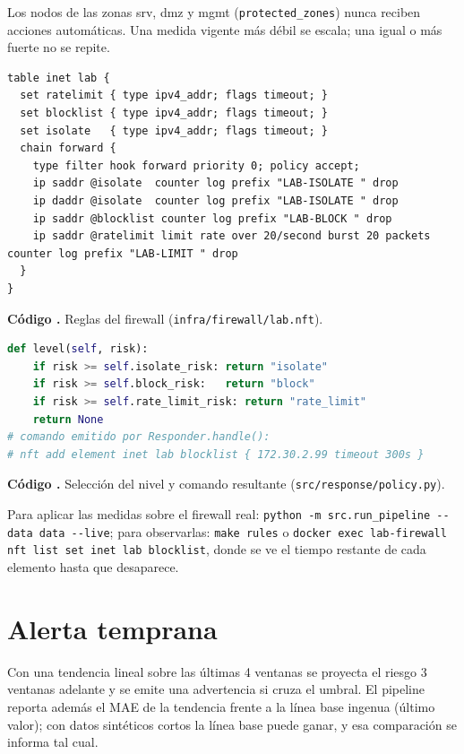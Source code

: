 \documentclass[conference,onecolumn]{IEEEtran}
\newcommand{\cmd}[1]{\texttt{#1}}
\newcounter{codigo}
\newcommand{\codigo}[2]{\par\refstepcounter{codigo}\label{#2}{\footnotesize\textbf{Código \thecodigo.} #1}\par\nopagebreak}
\begin{document}
Los nodos de las zonas srv, dmz y mgmt (\cmd{protected\_zones}) nunca reciben acciones automáticas. Una medida vigente más débil se escala; una igual o más fuerte no se repite.
\begin{lstlisting}
table inet lab {
  set ratelimit { type ipv4_addr; flags timeout; }
  set blocklist { type ipv4_addr; flags timeout; }
  set isolate   { type ipv4_addr; flags timeout; }
  chain forward {
    type filter hook forward priority 0; policy accept;
    ip saddr @isolate  counter log prefix "LAB-ISOLATE " drop
    ip daddr @isolate  counter log prefix "LAB-ISOLATE " drop
    ip saddr @blocklist counter log prefix "LAB-BLOCK " drop
    ip saddr @ratelimit limit rate over 20/second burst 20 packets counter log prefix "LAB-LIMIT " drop
  }
}
\end{lstlisting}
\codigo{Reglas del firewall (\cmd{infra/firewall/lab.nft}).}{cod:nft}
\begin{lstlisting}[language=Python]
def level(self, risk):
    if risk >= self.isolate_risk: return "isolate"
    if risk >= self.block_risk:   return "block"
    if risk >= self.rate_limit_risk: return "rate_limit"
    return None
# comando emitido por Responder.handle():
# nft add element inet lab blocklist { 172.30.2.99 timeout 300s }
\end{lstlisting}
\codigo{Selección del nivel y comando resultante (\cmd{src/response/policy.py}).}{cod:policy}

Para aplicar las medidas sobre el firewall real: \cmd{python -m src.run\_pipeline {-}{-}data data {-}{-}live}; para observarlas: \cmd{make rules} o \cmd{docker exec lab-firewall nft list set inet lab blocklist}, donde se ve el tiempo restante de cada elemento hasta que desaparece.

\section{Alerta temprana}
Con una tendencia lineal sobre las últimas 4 ventanas se proyecta el riesgo 3 ventanas adelante y se emite una advertencia si cruza el umbral. El pipeline reporta además el MAE de la tendencia frente a la línea base ingenua (último valor); con datos sintéticos cortos la línea base puede ganar, y esa comparación se informa tal cual.
\end{document}
